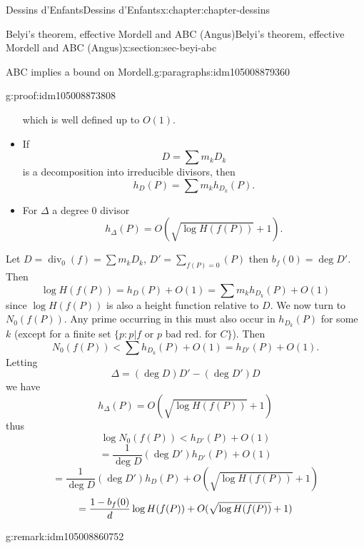 \documentclass[oneside,10pt,]{book}
\newcommand{\qedhere}{\relax}
\numberwithin{equation}{section}
\DeclareMathOperator{\divisor}{div}
\newcommand{\lt}{<}
\begin{document}
\begin{chapterptx}{Dessins d'Enfants}{}{Dessins d'Enfants}{}{}{x:chapter:chapter-dessins}
\begin{sectionptx}{Belyi's theorem, effective Mordell and ABC (Angus)}{}{Belyi's theorem, effective Mordell and ABC (Angus)}{}{}{x:section:sec-beyi-abc}
\begin{paragraphs}{ABC implies a bound on Mordell.}{g:paragraphs:idm105008879360}
\begin{proofptx}{}{g:proof:idm105008873808}
\begin{itemize}[label=\textbullet]
which is well defined up to  \(O(1)\).%
\item{}If%
\begin{equation*}
D=  \sum m_k D_k
\end{equation*}
is a decomposition into irreducible divisors, then%
\begin{equation*}
h_D(P) = \sum m_k h_{D_k}(P)\text{.}
\end{equation*}
%
\item{}For \(\Delta\) a degree 0 divisor%
\begin{equation*}
h_{\Delta} (P) = O(\sqrt{\log H(f(P))} + 1)\text{.}
\end{equation*}
%
\end{itemize}
%
\par
Let \(D = \divisor_0(f) = \sum m_k D_k\), \(D' = \sum_{f(P) = 0} (P)\) then \(b_f(0) = \deg D'\). Then%
\begin{equation*}
\log H(f(P)) = h_D(P) + O(1) = \sum m_k h_{D_k}(P) + O(1)
\end{equation*}
since \(\log H(f(P))\) is also a height function relative to \(D\). We now turn to \(N_0(f(P))\). Any prime occurring in this must also occur in \(h_{D_k}(P)\) for some \(k\) (except for a finite set \(\{p : p|f \text{ or } p \text{ bad red. for } C\}\)). Then%
\begin{equation*}
N_0(f(P))  \lt \sum h_{D_k}(P) + O(1) = h_{D'}(P) + O(1)\text{.}
\end{equation*}
Letting%
\begin{equation*}
\Delta = (\deg D) D' - (\deg D') D
\end{equation*}
we have%
\begin{equation*}
h_{\Delta} (P) = O(\sqrt{\log H(f(P))} + 1)
\end{equation*}
thus%
\begin{equation*}
\log N_0(f(P)) \lt h_{D'} (P) + O(1)
\end{equation*}
%
\begin{equation*}
= \frac{1}{\deg D} (\deg D') h_{D'} (P) + O(1)
\end{equation*}
%
\begin{equation*}
= \frac{1}{\deg D} (\deg D') h_{D} (P) + O(\sqrt{\log H(f(P))} + 1)
\end{equation*}
%
\begin{equation*}
= \frac{1- b_f(0)}{d} \log  H(f(P)) + O(\sqrt{\log H(f(P))} + 1)\qedhere
\end{equation*}
%
\end{proofptx}
\begin{remark}{}{g:remark:idm105008860752}%

\end{remark}
\end{paragraphs}
\end{sectionptx}
\end{chapterptx}
\end{document}
